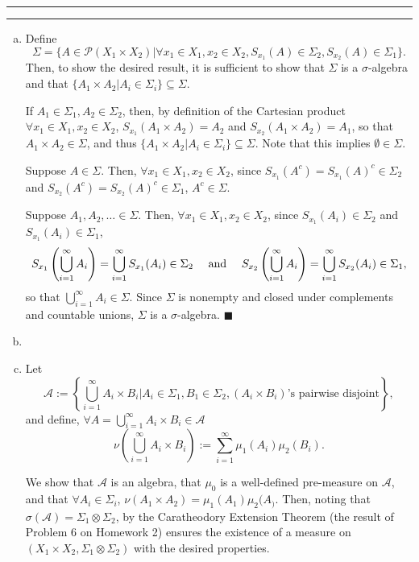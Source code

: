 \documentclass[11pt]{article}
\newcounter{questionCounter}
\newcounter{partCounter}[questionCounter]
\newenvironment{question}[2][\arabic{questionCounter}]{%
    \setcounter{partCounter}{0}%
    \vspace{.25in} \hrule \vspace{0.5em}%
        \noindent{\bf #2}%
    \vspace{0.8em} \hrule \vspace{.10in}%
    \addtocounter{questionCounter}{1}%
}{}
\renewcommand{\qed}{\quad $\blacksquare$}
\newcommand{\pow}[1]{\mathcal{P}\left(#1\right)} %
\begin{document}
\begin{question}{Problem 5}
\begin{enumerate}[(a)]
\item Define
\[\Sigma
 = \{A \in \pow{X_1 \times X_2} |
     \forall x_1 \in X_1, x_2 \in X_2,
       S_{x_1}(A) \in \Sigma_2, S_{x_2}(A) \in \Sigma_1\}.
\]
Then, to show the desired result, it is sufficient to show that $\Sigma$ is a
$\sigma$-algebra and that
$\{A_1 \times A_2 | A_i \in \Sigma_i\} \subseteq \Sigma$.

If $A_1 \in \Sigma_1, A_2 \in \Sigma_2$, then, by definition of the Cartesian
product $\forall x_1 \in X_1,x_2 \in X_2$, ${S_{x_1}(A_1 \times A_2) = A_2}$ and
$S_{x_2}(A_1 \times A_2) = A_1$, so that $A_1 \times A_2 \in \Sigma$, and thus
${\{A_1 \times A_2 | A_i \in \Sigma_i\} \subseteq \Sigma}$. Note that this
implies $\emptyset \in \Sigma$.

Suppose $A \in \Sigma$. Then, $\forall x_1 \in X_1,x_2 \in X_2$, since
$S_{x_1}(A^c) = S_{x_1}(A)^c \in \Sigma_2$ and
${S_{x_2}(A^c) = S_{x_2}(A)^c \in \Sigma_1}$, $A^c \in \Sigma$.

Suppose $A_1,A_2,\ldots \in \Sigma$. Then, $\forall x_1 \in X_1,x_2 \in X_2$,
since $S_{x_1}(A_i) \in \Sigma_2$ and $S_{x_1}(A_i) \in \Sigma_1$,
\[S_{x_1}\left( \bigcup_{i = 1}^{\infty} A_i \right)
 = \bigcup_{i = 1}^{\infty} S_{x_1}(A_i) \in \Sigma_2
    \mbox{ \quad and \quad }
  S_{x_2}\left( \bigcup_{i = 1}^{\infty} A_i \right)
 = \bigcup_{i = 1}^{\infty} S_{x_2}(A_i) \in \Sigma_1,
\]
so that $\bigcup_{i = 1}^{\infty} A_i \in \Sigma$. Since $\Sigma$ is nonempty
and closed under complements and countable unions, $\Sigma$ is a
$\sigma$-algebra. \qed

\item

\item Let
\[\mathcal{A}
      := \left\{\bigcup_{i = 1}^{\infty} A_i \times B_i |
                A_i \in \Sigma_1, B_1 \in \Sigma_2,
                (A_i \times B_i)\mbox{'s pairwise disjoint}\right\},\]
and define,
$\forall A = \bigcup_{i = 1}^{\infty} A_i \times B_i \in \mathcal{A}$
\[\nu \left( \bigcup_{i = 1}^{\infty} A_i \times B_i \right)
 := \sum_{i = 1}^{\infty} \mu_1(A_i)\mu_2(B_i).\]

We show that $\mathcal{A}$ is an algebra, that $\mu_0$ is a well-defined
pre-measure on $\mathcal{A}$, and that $\forall A_i \in \Sigma_i$,
$\nu(A_1 \times A_2) = \mu_1(A_1)\mu_2(A_)$. Then, noting that
$\sigma(\mathcal{A}) = \Sigma_1 \otimes \Sigma_2$, by the Caratheodory
Extension Theorem (the result of Problem 6 on Homework 2) ensures the
existence of a measure on $(X_1 \times X_2,\Sigma_1 \otimes \Sigma_2)$ with
the desired properties.


\end{enumerate}
\end{question}
\end{document}
